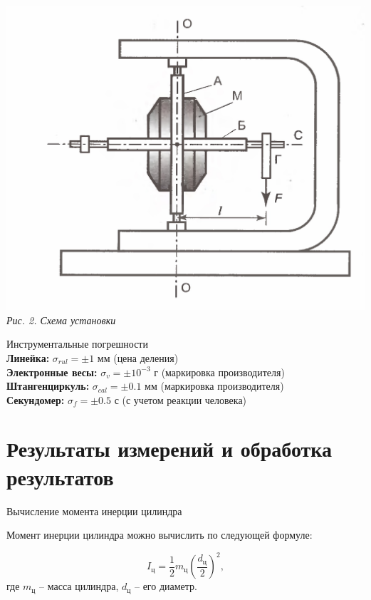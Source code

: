 \documentclass[12pt, a4paper]{article}
\begin{document}
\begin{center}
    \includegraphics[scale=0.3]{Pics/picture2.jpg} \\
    \textit{\textcolor[HTML]{000000}{Рис. 2. Схема установки}}
\end{center}

{\large Инструментальные погрешности \\}
\textbf{Линейка: } $\sigma_{rul} = \pm 1$ мм (цена деления)\\
\textbf{Электронные весы: } $\sigma_{v} = \pm 10^{-3}$ г (маркировка производителя) \\
\textbf{Штангенциркуль: } $\sigma_{cal} = \pm 0.1$ мм (маркировка производителя) \\
\textbf{Секундомер: } $\sigma_{f} = \pm 0.5$ с (с учетом реакции человека) \\

\section{Результаты измерений и обработка результатов}

{\large Вычисление момента инерции цилиндра \\}

Момент инерции цилиндра можно вычислить по следующей формуле:

\begin{equation}
I_\text{ц} = \frac{1}{2}m_\text{ц}\left( \frac{d_\text{ц}}{2}\right)^2,
\end{equation}
где $ m_\text{ц} $ -- масса цилиндра, $ d_\text{ц} $ -- его диаметр.
\end{document}
